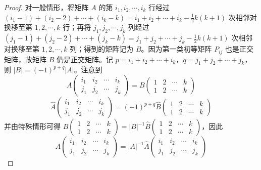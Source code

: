 \documentclass[../../main.tex]{subfiles}
\begin{document}
\begin{proof}
对一般情形，将矩阵 \(A\) 的第 \(i_1,i_2,\cdots,i_k\) 行经过 \((i_1 - 1)+(i_2 - 2)+\cdots+(i_k - k)=i_1 + i_2 + \cdots + i_k - \frac{1}{2}k(k + 1)\) 次相邻对换移至第 \(1,2,\cdots,k\) 行；再将 \(j_1,j_2,\cdots,j_k\) 列经过 \((j_1 - 1)+(j_2 - 2)+\cdots+(j_k - k)=j_1 + j_2 + \cdots + j_k - \frac{1}{2}k(k + 1)\) 次相邻对换移至第 \(1,2,\cdots,k\) 列；得到的矩阵记为 \(B\)。因为第一类初等矩阵 \(P_{ij}\) 也是正交矩阵，故矩阵 \(B\) 仍是正交矩阵。记 \(p = i_1 + i_2 + \cdots + i_k\)，\(q = j_1 + j_2 + \cdots + j_k\)，则 \(\vert B\vert = (-1)^{p + q}\vert A\vert\)。注意到
\[A\begin{pmatrix}
i_1 & i_2 & \cdots & i_k \\
j_1 & j_2 & \cdots & j_k
\end{pmatrix} = B\begin{pmatrix}
1 & 2 & \cdots & k \\
1 & 2 & \cdots & k
\end{pmatrix}\]
\[\widehat{A}\begin{pmatrix}
i_1 & i_2 & \cdots & i_k \\
j_1 & j_2 & \cdots & j_k
\end{pmatrix} = (-1)^{p + q}\widehat{B}\begin{pmatrix}
1 & 2 & \cdots & k \\
1 & 2 & \cdots & k
\end{pmatrix}\]
并由特殊情形可得 \(B\begin{pmatrix}
1 & 2 & \cdots & k \\
1 & 2 & \cdots & k
\end{pmatrix} = \vert B\vert^{-1}\widehat{B}\begin{pmatrix}
1 & 2 & \cdots & k \\
1 & 2 & \cdots & k
\end{pmatrix}\)，因此
\[A\begin{pmatrix}
i_1 & i_2 & \cdots & i_k \\
j_1 & j_2 & \cdots & j_k
\end{pmatrix} = \vert A\vert^{-1}\widehat{A}\begin{pmatrix}
i_1 & i_2 & \cdots & i_k \\
j_1 & j_2 & \cdots & j_k
\end{pmatrix}\] 

\end{proof}
\end{document}

